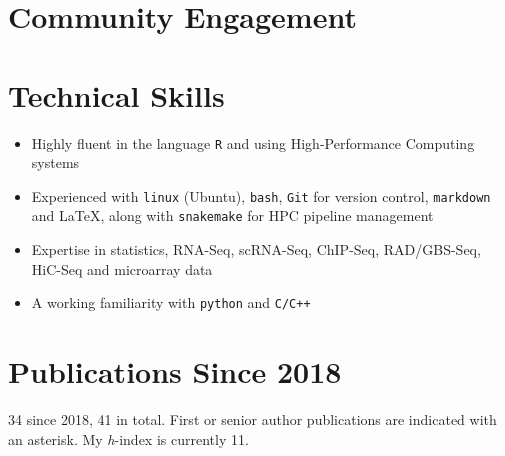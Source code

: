 \documentclass[11pt,a4paper,]{moderncv}
\providecommand{\tightlist}{%
	\setlength{\itemsep}{0pt}\setlength{\parskip}{0pt}}
\begin{document}
\hypertarget{community-engagement}{%
\section{Community Engagement}\label{community-engagement}}

\nopagebreak

\hypertarget{technical-skills}{%
\section{Technical Skills}\label{technical-skills}}

\begin{itemize}
\tightlist
\item
  Highly fluent in the language \texttt{R} and using High-Performance
  Computing systems
\item
  Experienced with \texttt{linux} (Ubuntu), \texttt{bash}, \texttt{Git}
  for version control, \texttt{markdown} and \LaTeX, along with
  \texttt{snakemake} for HPC pipeline management
\item
  Expertise in statistics, RNA-Seq, scRNA-Seq, ChIP-Seq, RAD/GBS-Seq,
  HiC-Seq and microarray data
\item
  A working familiarity with \texttt{python} and \texttt{C/C++}
\end{itemize}

\hypertarget{publications-since-2018}{%
\section{Publications Since 2018}\label{publications-since-2018}}

34 since 2018, 41 in total. First or senior author publications are
indicated with an asterisk. My \emph{h}-index is currently 11.

\vspace{4mm}
\end{document}
